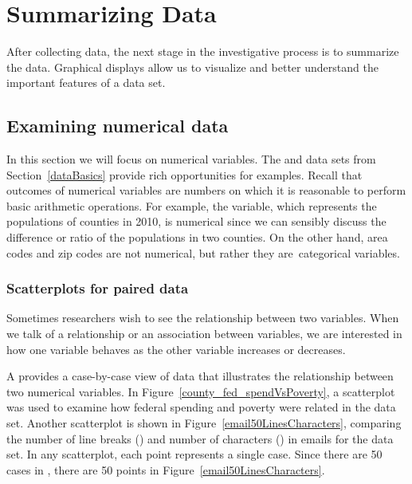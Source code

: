\chapter{Summarizing Data}
\label{summarizingData}

After collecting data, the next stage in the investigative process is to summarize the data. Graphical displays allow us to visualize and better understand the important features of a data set.

\section[Examining numerical data]{Examining numerical data }
\label{numericalData}
In this section we will focus on numerical variables. The  and  data sets from Section~\ref{dataBasics} provide rich opportunities for examples. Recall that outcomes of numerical variables are numbers on which it is reasonable to perform basic arithmetic operations. For example, the  variable, which represents the populations of counties in 2010, is numerical since we can sensibly discuss the difference or ratio of the populations in two counties. On the other hand, area codes and zip codes are not numerical, but rather they are~categorical variables.


\subsection{Scatterplots for paired data}
\label{scatterPlots}


Sometimes researchers wish to see the relationship between two variables. When we talk of a relationship or an association between variables, we are interested in how one variable behaves as the other variable increases or decreases.

A  provides a case-by-case view of data that illustrates the relationship between two numerical variables. In Figure~\vref{county_fed_spendVsPoverty}, a scatterplot was used to examine how federal spending and poverty were related in the  data set. Another scatterplot is shown in Figure~\ref{email50LinesCharacters}, comparing the number of line breaks () and number of characters () in emails for the  data set. In any scatterplot, each point represents a single case. Since there are 50 cases in , there are 50 points in Figure~\ref{email50LinesCharacters}.

